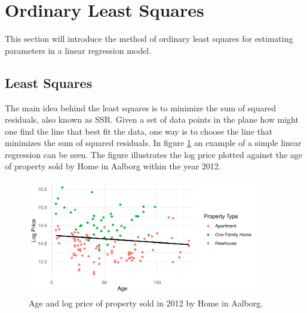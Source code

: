 \section{Ordinary Least Squares}
This section will introduce the method of ordinary least squares for estimating parameters in a linear regression model.

\subsection{Least Squares}
The main idea behind the least squares is to minimize the sum of squared residuals, also known as SSR. 
Given a set of data points in the plane how might one find the line that best fit the data, one way is to choose the line that minimizes the sum of squared residuals.
In figure \ref{fig:example_simple_linear_regression} an example of a simple linear regression can be seen. 
The figure illustrates the log price plotted against the age of property sold by Home in Aalborg within the year 2012.
\begin{figure}[h]
    \centering
    \includegraphics[width = 0.9\textwidth]{figures/Ordinary_Least_Squares/example_linear_regression.pdf}
    \caption{Age and log price of property sold in 2012 by Home in Aalborg.}
    \label{fig:example_simple_linear_regression}
\end{figure}

